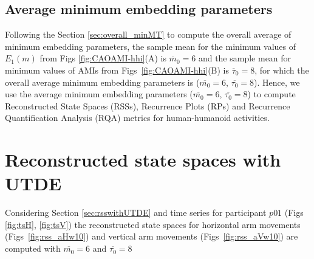 %



\newpage
\subsection{Average minimum embedding parameters}
Following the Section \ref{sec:overall_minMT} to compute the overall average 
of minimum embedding parameters, the sample mean for the 
minimum values of $E_{1}(m)$ from Figs \ref{fig:CAOAMI-hhi}(A) 
is $\overline{m}_0=6$ and the sample 
mean for minimum values of AMIs from Figs~\ref{fig:CAOAMI-hhi}(B)
is $\overline{\tau}_0=8$, for which the overall average minimum embedding 
parameters is ($\overline{m_0}=6$, $\overline{\tau_0}=8$).
Hence, we use the average minimum embedding parameters 
($\overline{m_0}=6$, $\overline{\tau_0}=8$) to compute 
Reconstructed State Spaces (RSSs), Recurrence Plots (RPs) and
Recurrence Quantification Analysis (RQA) metrics for human-humanoid activities.


\section{Reconstructed state spaces with UTDE}
Considering Section \ref{sec:rsswithUTDE} and time series for participant $p01$ 
(Figs \ref{fig:tsH}, \ref{fig:tsV}) the reconstructed state spaces
for horizontal arm movements (Figs~\ref{fig:rss_aHw10}) and
 vertical arm movements  (Figs~\ref{fig:rss_aVw10}) 
are computed with $\overline{m_0}=6$ and $\overline{\tau_0}=8$ 


